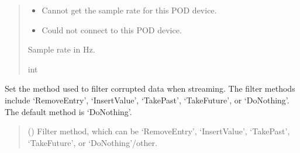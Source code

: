 \documentclass[letterpaper,10pt,english]{sphinxmanual}
\begin{document}
\begin{fulllineitems}
\begin{fulllineitems}
\begin{quote}
\begin{description}
\begin{itemize}
\item {} 
\sphinxAtStartPar
{} \textendash{} Cannot get the sample rate for this POD device.

\item {} 
\sphinxAtStartPar
{} \textendash{} Could not connect to this POD device.

\end{itemize}

\sphinxAtStartPar
Sample rate in Hz.

\sphinxAtStartPar
int

\end{description}\end{quote}

\end{fulllineitems}


\begin{fulllineitems}
\label{\detokenize{PodApi.Stream.Collect:PodApi.Stream.Collect.DataHose.Hose.PickFilterMethod}}
\pysigstartsignatures
{}
\pysigstopsignatures
\sphinxAtStartPar
Set the method used to filter corrupted data when streaming. The filter methods         include ‘RemoveEntry’, ‘InsertValue’, ‘TakePast’, ‘TakeFuture’, or ‘DoNothing’.          The default method is ‘DoNothing’.
\begin{quote}\begin{description}
\sphinxAtStartPar
{} () \textendash{} Filter method, which can be ‘RemoveEntry’,
‘InsertValue’, ‘TakePast’, ‘TakeFuture’, or ‘DoNothing’/other.

\end{description}\end{quote}

\end{fulllineitems}



\end{fulllineitems}
\end{document}
